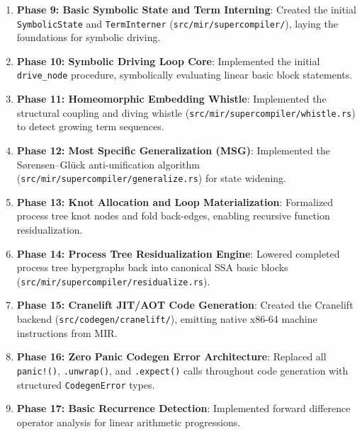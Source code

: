 \begin{enumerate}
    \item \textbf{Phase 9: Basic Symbolic State and Term Interning}: Created the initial \texttt{SymbolicState} and \texttt{TermInterner} (\texttt{src/mir/supercompiler/}), laying the foundations for symbolic driving.
    \item \textbf{Phase 10: Symbolic Driving Loop Core}: Implemented the initial \texttt{drive\_node} procedure, symbolically evaluating linear basic block statements.
    \item \textbf{Phase 11: Homeomorphic Embedding Whistle}: Implemented the structural coupling and diving whistle (\texttt{src/mir/supercompiler/whistle.rs}) to detect growing term sequences.
    \item \textbf{Phase 12: Most Specific Generalization (MSG)}: Implemented the S\o{}rensen--Gl\"uck anti-unification algorithm (\texttt{src/mir/supercompiler/generalize.rs}) for state widening.
    \item \textbf{Phase 13: Knot Allocation and Loop Materialization}: Formalized process tree knot nodes and fold back-edges, enabling recursive function residualization.
    \item \textbf{Phase 14: Process Tree Residualization Engine}: Lowered completed process tree hypergraphs back into canonical SSA basic blocks (\texttt{src/mir/supercompiler/residualize.rs}).
    \item \textbf{Phase 15: Cranelift JIT/AOT Code Generation}: Created the Cranelift backend (\texttt{src/codegen/cranelift/}), emitting native x86-64 machine instructions from MIR.
    \item \textbf{Phase 16: Zero Panic Codegen Error Architecture}: Replaced all \texttt{panic!()}, \texttt{.unwrap()}, and \texttt{.expect()} calls throughout code generation with structured \texttt{CodegenError} types.
    \item \textbf{Phase 17: Basic Recurrence Detection}: Implemented forward difference operator analysis for linear arithmetic progressions.
\end{enumerate}


